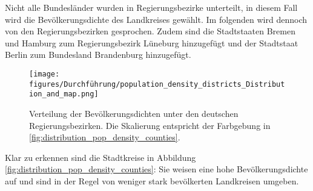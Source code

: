 Nicht alle Bundesländer wurden in Regierungsbezirke unterteilt, in diesem Fall wird die Bevölkerungsdichte des Landkreises gewählt. Im folgenden wird dennoch von \glqq{}den Regierungsbezirken\grqq{} gesprochen. Zudem sind die Stadtstaaten Bremen und Hamburg zum Regierungsbezirk Lüneburg hinzugefügt und der Stadtstaat Berlin zum Bundesland Brandenburg hinzugefügt.

\begin{figure}[H]
    \centering
    \texttt{[image: figures/Durchführung/population\_density\_districts\_Distribution\_and\_map.png]}
    \caption{Verteilung der Bevölkerungsdichten unter den deutschen Regierungsbezirken. Die Skalierung entspricht der Farbgebung in \autoref{fig:distribution_pop_density_counties}.}
    \label{fig:distribution_pop_density_districts}
\end{figure}

Klar zu erkennen sind die Stadtkreise in Abbildung \ref{fig:distribution_pop_density_counties}: Sie weisen eine hohe Bevölkerungsdichte auf und sind in der Regel von weniger stark bevölkerten Landkreisen umgeben.

